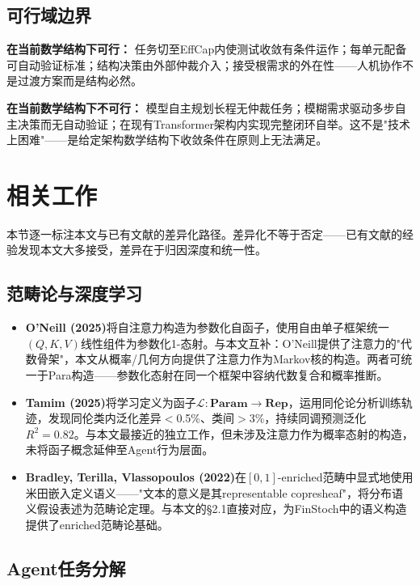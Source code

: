 \documentclass[11pt,a4paper]{ctexart}
\begin{document}
\subsection{可行域边界}

\textbf{在当前数学结构下可行：} 任务切至EffCap内使测试收敛有条件运作；每单元配备可自动验证标准；结构决策由外部仲裁介入；接受根需求的外在性——人机协作不是过渡方案而是结构必然。

\textbf{在当前数学结构下不可行：} 模型自主规划长程无仲裁任务；模糊需求驱动多步自主决策而无自动验证；在现有Transformer架构内实现完整闭环自举。这不是"技术上困难"——是给定架构数学结构下收敛条件在原则上无法满足。


\section{相关工作}

本节逐一标注本文与已有文献的差异化路径。差异化不等于否定——已有文献的经验发现本文大多接受，差异在于归因深度和统一性。

\subsection{范畴论与深度学习}

\begin{itemize}[leftmargin=*]
    \item \textbf{O'Neill (2025)}\cite{ONeill2025Endofunctor}将自注意力构造为参数化自函子，使用自由单子框架统一$(Q,K,V)$线性组件为参数化1-态射。与本文互补：O'Neill提供了注意力的"代数骨架"，本文从概率/几何方向提供了注意力作为Markov核的构造。两者可统一于Para构造\cite{Fong2019Para}——参数化态射在同一个框架中容纳代数复合和概率推断。
    \item \textbf{Tamim (2025)}\cite{Tamim2025Categorical}将学习定义为函子$\mathcal{L}: \mathbf{Param} \to \mathbf{Rep}$，运用同伦论分析训练轨迹，发现同伦类内泛化差异$<$0.5\%、类间$>$3\%，持续同调预测泛化$R^2=0.82$。与本文最接近的独立工作，但未涉及注意力作为概率态射的构造，未将函子概念延伸至Agent行为层面。
    \item \textbf{Bradley, Terilla, Vlassopoulos (2022)}\cite{Bradley2022Enriched}在$[0,1]$-enriched范畴中显式地使用米田嵌入定义语义——"文本的意义是其representable copresheaf"，将分布语义假设表述为范畴论定理。与本文的§2.1直接对应，为FinStoch中的语义构造提供了enriched范畴论基础。
\end{itemize}

\subsection{Agent任务分解}
\end{document}
